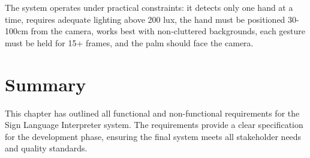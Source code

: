The system operates under practical constraints: it detects only one hand at a time, requires adequate lighting above 200 lux, the hand must be positioned 30-100cm from the camera, works best with non-cluttered backgrounds, each gesture must be held for 15+ frames, and the palm should face the camera.

\vspace{1em}
\section{Summary}

This chapter has outlined all functional and non-functional requirements for the Sign Language Interpreter system. The requirements provide a clear specification for the development phase, ensuring the final system meets all stakeholder needs and quality standards.